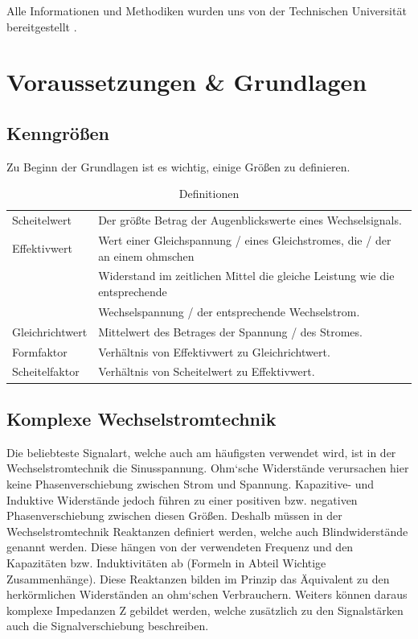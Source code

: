 \documentclass[12pt,a4paper,twoside]{article}
\begin{document}
\noindent
Alle Informationen und Methodiken wurden uns von der Technischen Universität bereitgestellt \cite{teachcenter2}. 



\section{Voraussetzungen \& Grundlagen} %

\subsection{Kenngrößen}

Zu Beginn der Grundlagen ist es wichtig, einige Größen zu definieren.

\begin{table}[H]
    \centering
    \caption{Definitionen \cite{teachcenter2}}
    \label{tab:definitionen}
    \begin{tabular}{| l | l |}
        \hline
        Scheitelwert & Der größte Betrag der Augenblickswerte eines Wechselsignals. \\
        Effektivwert & Wert einer Gleichspannung / eines Gleichstromes, die / der an einem ohmschen \\
         & Widerstand im zeitlichen Mittel die gleiche Leistung wie die entsprechende \\
         & Wechselspannung / der entsprechende Wechselstrom. \\
        Gleichrichtwert & Mittelwert des Betrages der Spannung / des Stromes. \\
        Formfaktor & Verhältnis von Effektivwert zu Gleichrichtwert. \\
        Scheitelfaktor & Verhältnis von Scheitelwert zu Effektivwert. \\
        \hline
    \end{tabular}
\end{table}

\subsection{Komplexe Wechselstromtechnik}

Die beliebteste Signalart, welche auch am häufigsten verwendet wird, ist in der Wechselstromtechnik die Sinusspannung. 
Ohm`sche Widerstände verursachen hier keine Phasenverschiebung zwischen Strom und Spannung. Kapazitive- und Induktive Widerstände jedoch führen zu einer positiven bzw. negativen Phasenverschiebung zwischen diesen Größen.
Deshalb müssen in der Wechselstromtechnik Reaktanzen definiert werden, welche auch Blindwiderstände genannt werden. 
Diese hängen von der verwendeten Frequenz und den Kapazitäten bzw. Induktivitäten ab (Formeln in Abteil Wichtige Zusammenhänge).
Diese Reaktanzen bilden im Prinzip das Äquivalent zu den herkörmlichen Widerständen an ohm`schen Verbrauchern.
Weiters können daraus komplexe Impedanzen Z gebildet werden, welche zusätzlich zu den Signalstärken auch die Signalverschiebung beschreiben. 
\end{document}
